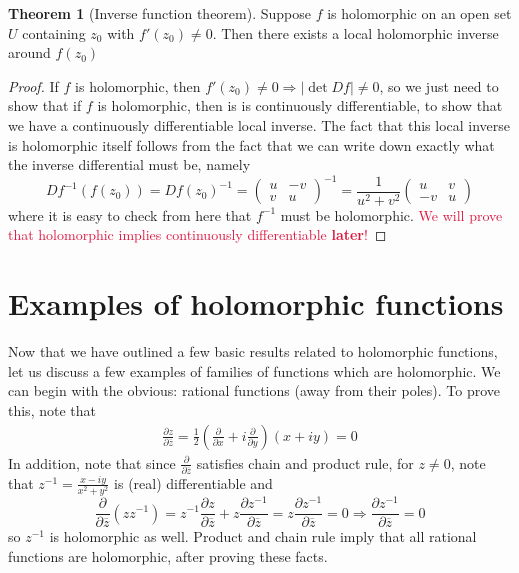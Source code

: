 \documentclass[aps,pra,showpacs,notitlepage,onecolumn,superscriptaddress,nofootinbib]{revtex4-1}
\newcommand{\pop}[1]{\textcolor{crimson}{#1}}
\theoremstyle{definition}
\newtheorem{theorem}{Theorem}[section]
\begin{document}
\begin{theorem}[Inverse function theorem]
Suppose $f$ is holomorphic on an open set $U$ containing $z_0$ with $f'(z_0) \neq 0$. Then there exists a local holomorphic inverse around $f(z_0)$
\end{theorem}
\begin{proof}
  If $f$ is holomorphic, then $f'(z_0) \neq 0 \Rightarrow |\det Df| \neq 0$, so we just need to show that if $f$ is holomorphic, then is is continuously differentiable,
  to show that we have a continuously differentiable local inverse. The fact that this local inverse is holomorphic itself follows from the fact that we can write down
  exactly what the inverse differential must be, namely
  \begin{equation}
    D f^{-1}(f(z_0)) = Df(z_0)^{-1} = \begin{pmatrix} u & -v \\ v & u \end{pmatrix}^{-1} = \frac{1}{u^2 + v^2} \begin{pmatrix} u & v \\ -v & u \end{pmatrix}
  \end{equation}
  where it is easy to check from here that $f^{-1}$ must be holomorphic. \pop{We will prove that holomorphic implies continuously differentiable \textbf{later}!}
\end{proof}

\section{Examples of holomorphic functions}

\noindent Now that we have outlined a few basic results related to holomorphic functions, let us discuss a few examples of families of functions which are holomorphic.
We can begin with the obvious: rational functions (away from their poles). To prove this, note that
\begin{align}
  \frac{\partial z}{\partial \overline{z}} = \frac{1}{2} \left( \frac{\partial}{\partial x} + i \frac{\partial}{\partial y} \right) (x + iy) = 0
\end{align}
In addition, note that since $\frac{\partial}{\partial \overline{z}}$ satisfies chain and product rule, for $z \neq 0$, note that $z^{-1} = \frac{x - iy}{x^2 + y^2}$ is (real) differentiable and
\begin{equation}
  \frac{\partial}{\partial \overline{z}} (z z^{-1}) = z^{-1} \frac{\partial z}{\partial \overline{z}} + z \frac{\partial z^{-1}}{\partial \overline{z}} = z \frac{\partial z^{-1}}{\partial \overline{z}} = 0 \Rightarrow \frac{\partial z^{-1}}{\partial \overline{z}} = 0
\end{equation}
so $z^{-1}$ is holomorphic as well. Product and chain rule imply that all rational functions are holomorphic, after proving these facts.
\end{document}
